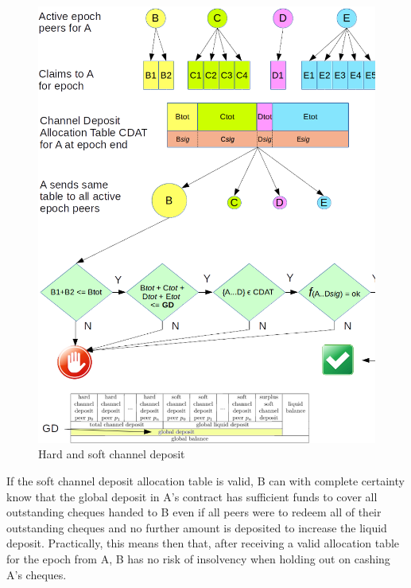 \begin{center}
\begin{figure}
\begin{center}
\includegraphics[scale=0.6]{diagrams/soft-channel.png}
\end{center}
\caption{Hard and soft channel deposit}
\label{fig:softchanneldeposit}
\end{figure}
\end{center}


If the soft channel deposit allocation table is valid, B can with complete certainty know that the global deposit in A's contract has sufficient funds to cover all outstanding cheques handed to B even if all peers were to redeem all of their outstanding cheques and no further amount is deposited to increase the liquid deposit.
Practically, this means then that, after receiving a valid allocation table for the epoch from A, B has no risk of insolvency when holding out on cashing A's cheques. 

